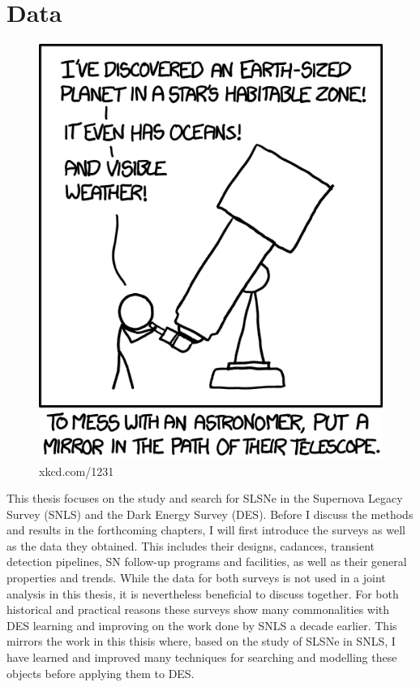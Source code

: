 \chapter{Data}
\label{Chapter2}

\begin{figure}[H]
  \centering
  \includegraphics{Figures/xkcd/chapter2.png}
  \caption*{xkcd.com/1231}
\end{figure}

This thesis focuses on the study and search for SLSNe in the Supernova Legacy Survey (SNLS) and the Dark Energy Survey (DES). Before I discuss the methods and results in the forthcoming chapters, I will first introduce the surveys as well as the data they obtained. This includes their designs, cadances, transient detection pipelines, SN follow-up programs and facilities, as well as their general properties and trends. While the data for both surveys is not used in a joint analysis in this thesis, it is nevertheless beneficial to discuss together. For both historical and practical reasons these surveys show many commonalities with DES learning and improving on the work done by SNLS a decade earlier. This mirrors the work in this thisis where, based on the study of SLSNe in SNLS, I have learned and improved many techniques for searching and modelling these objects before applying them to DES.

